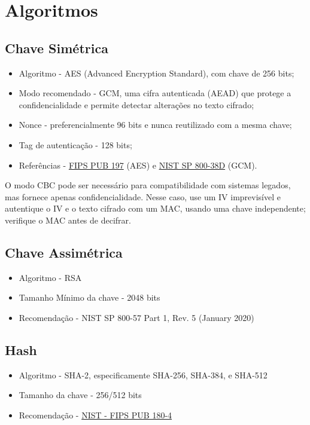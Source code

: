 \section{Algoritmos}

\subsection{Chave Simétrica}
	\begin{itemize}
		\item Algoritmo - AES (Advanced Encryption Standard), com chave de 256 bits;
		\item Modo recomendado - GCM, uma cifra autenticada (AEAD) que protege a confidencialidade e permite detectar alterações no texto cifrado;
		\item Nonce - preferencialmente 96 bits e nunca reutilizado com a mesma chave;
		\item Tag de autenticação - 128 bits;
		\item Referências - \href{https://nvlpubs.nist.gov/nistpubs/FIPS/NIST.FIPS.197.pdf}{FIPS PUB 197} (AES) e \href{https://csrc.nist.gov/pubs/sp/800/38/d/final}{NIST SP 800-38D} (GCM).
	\end{itemize}

O modo CBC pode ser necessário para compatibilidade com sistemas legados, mas fornece apenas confidencialidade. Nesse caso, use um IV imprevisível e autentique o IV e o texto cifrado com um MAC, usando uma chave independente; verifique o MAC antes de decifrar.

\subsection{Chave Assimétrica}
	\begin{itemize}
		\item Algoritmo - RSA
		\item Tamanho Mínimo da chave - 2048 bits
		\item Recomendação - NIST SP 800-57 Part 1, Rev. 5 (January 2020)
	\end{itemize}

\subsection{Hash}
	\begin{itemize}
		\item Algoritmo - SHA-2, especificamente SHA-256, SHA-384, e SHA-512
		\item Tamanho da chave - 256/512 bits
		\item Recomendação - \href{https://nvlpubs.nist.gov/nistpubs/FIPS/NIST.FIPS.180-4.pdf}{NIST - FIPS PUB 180-4}
	\end{itemize}

